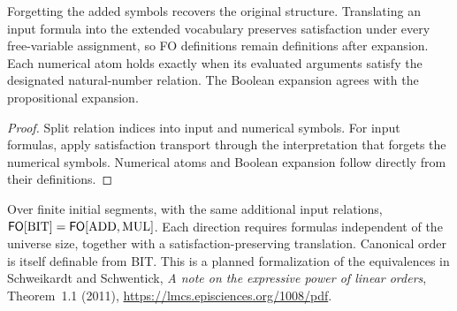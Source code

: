 \begin{theorem}
  \label{thm:desc-numerical-semantics}
  \leanok
  Forgetting the added symbols recovers the original structure. Translating an
  input formula into the extended vocabulary preserves satisfaction under every
  free-variable assignment, so FO definitions remain definitions after expansion.
  Each numerical atom holds exactly when its evaluated arguments satisfy the
  designated natural-number relation. The Boolean expansion agrees with the
  propositional expansion.
\end{theorem}
\begin{proof}
  \leanok
  Split relation indices into input and numerical symbols. For input formulas,
  apply satisfaction transport through the interpretation that forgets the
  numerical symbols. Numerical atoms and Boolean expansion follow directly
  from their definitions.
\end{proof}

\begin{theorem}
  \label{thm:desc-bit-arithmetic}
  Over finite initial segments, with the same additional input relations,
  $\mathsf{FO}[\mathrm{BIT}]=\mathsf{FO}[\mathrm{ADD},\mathrm{MUL}]$.
  Each direction requires formulas independent of the universe size, together
  with a satisfaction-preserving translation. Canonical order is itself
  definable from BIT. This is a planned formalization of the equivalences in
  Schweikardt and Schwentick, \emph{A note on the expressive power of linear
  orders}, Theorem~1.1 (2011), \url{https://lmcs.episciences.org/1008/pdf}.
\end{theorem}

